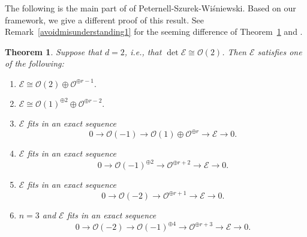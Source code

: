\documentclass[a4paper,12pt]{amsart}
\newtheorem{thm}{Theorem}[section]
\begin{document}
The following  is the main part of \cite[Theorem 1]{pswnef} of Peternell-Szurek-Wi\'{s}niewski.
Based on our framework, we give a different proof of this result.
See Remark~\ref{avoidmisunderstanding1} for the seeming difference of Theorem~\ref{d2OnProSpace}
and \cite[Theorem 1]{pswnef}.
\begin{thm}\label{d2OnProSpace}
Suppose that $d=2$, i.e., that $\det\mathcal{E}\cong \mathcal{O}(2)$. Then $\mathcal{E}$ satisfies one of the following:
\begin{enumerate}
\item[(1)] $\mathcal{E}\cong \mathcal{O}(2)\oplus\mathcal{O}^{\oplus r-1}.$
\item[(2)] $\mathcal{E}\cong \mathcal{O}(1)^{\oplus 2}\oplus\mathcal{O}^{\oplus r-2}.$
\item[(3)] $\mathcal{E}$ fits in an exact sequence
\[0\to\mathcal{O}(-1)\to\mathcal{O}(1)\oplus\mathcal{O}^{\oplus r}\to \mathcal{E}\to 0.\]
\item[(4)] $\mathcal{E}$ fits in an exact sequence
\[0\to\mathcal{O}(-1)^{\oplus 2}\to\mathcal{O}^{\oplus r+2}\to \mathcal{E}\to 0.\]
\item[(5)] $\mathcal{E}$ fits in an exact sequence
\[0\to\mathcal{O}(-2)\to\mathcal{O}^{\oplus r+1}\to \mathcal{E}\to 0.\]
\item[(6)] $n=3$ and $\mathcal{E}$ fits in an exact sequence
\[0\to\mathcal{O}(-2)\to\mathcal{O}(-1)^{\oplus 4}\to \mathcal{O}^{\oplus r+3}\to \mathcal{E}\to 0.\]
\end{enumerate}
\end{thm}
\end{document}

